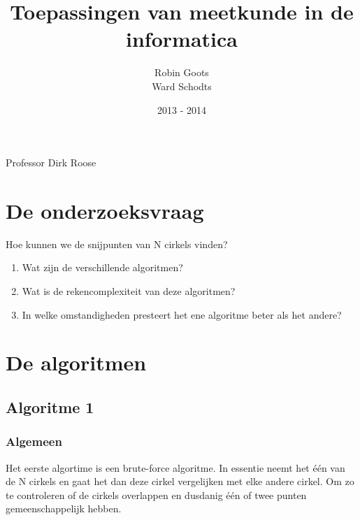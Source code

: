 \documentclass[11pt,a4paper]{article}
\begin{document}
\begin{titlepage}

\title{\Huge Toepassingen van meetkunde in de informatica}

\author{Robin Goots\\
Ward Schodts\\
}

\date{2013 - 2014}
\maketitle
\thispagestyle{empty}


\begin{center}
\Large Professor Dirk Roose
\vfill
\end{center}
\end{titlepage}
\section{De onderzoeksvraag}
Hoe kunnen we de snijpunten van N cirkels vinden?
\begin{enumerate}
\item Wat zijn de verschillende algoritmen?
\item Wat is de rekencomplexiteit van deze algoritmen?
\item In welke omstandigheden presteert het ene algoritme beter als het andere?
\end{enumerate}
\section{De algoritmen}
\subsection{Algoritme 1}
\subsubsection{Algemeen}
Het eerste algortime is een brute-force algoritme. In essentie neemt het \'e\'en van de N cirkels en gaat het dan deze cirkel vergelijken met elke andere cirkel. Om zo te controleren of de cirkels overlappen en dusdanig \'e\'en of twee punten gemeenschappelijk hebben.
\end{document}
